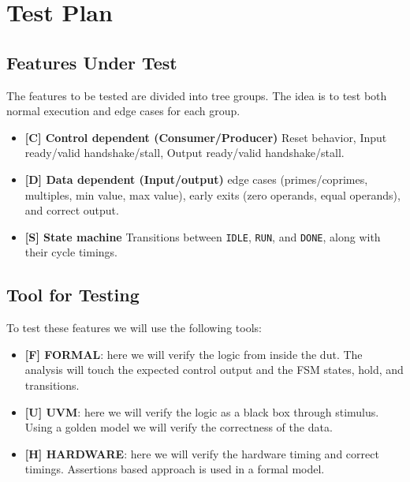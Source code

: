 \chapter{Test Plan}
\label{cha:test_plan}

\section{Features Under Test}

The features to be tested are divided into tree groups.
The idea is to test both normal execution and edge cases for each group.

\begin{itemize}
    \item \textbf{[C] Control dependent (Consumer/Producer)}
    Reset behavior, Input ready/valid handshake/stall, Output ready/valid handshake/stall.
    \item \textbf{[D] Data dependent (Input/output)}
    edge cases (primes/coprimes, multiples, min value, max value), early exits (zero operands, equal operands), and correct output.
    \item \textbf{[S] State machine}
    Transitions between \texttt{IDLE}, \texttt{RUN}, and \texttt{DONE}, along with their cycle timings.
\end{itemize}

\section{Tool for Testing}

To test these features we will use the following tools:
\begin{itemize}
    \item \textbf{[F] FORMAL}: here we will verify the logic from inside the dut.
    The analysis will touch the expected control output and the FSM states, hold, and transitions.
    \item \textbf{[U] UVM}: here we will verify the logic as a black box through stimulus.
    Using a golden model we will verify the correctness of the data.
    \item \textbf{[H] HARDWARE}: here we will verify the hardware timing and correct timings.
    Assertions based approach is used in a formal model.
\end{itemize}

